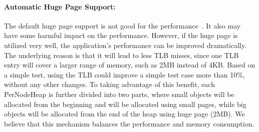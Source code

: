 


\paragraph{Automatic Huge Page Support:} The default huge page support is not good for the performance~\cite{}. It also may have some harmful impact on the performance. However, if the huge page is utilized very well, the application's performance can be improved dramatically. The underlying reason is that it will lead to less TLB misses, since one TLB entry will cover a larger range of memory, such as 2MB instead of 4KB. Based on a simple test, using the TLB could improve a simple test case more than 10\%, without any other changes. To taking advantage of this benefit, each PerNodeHeap is further divided into two parts, where small objects will be allocated from the beginning and will be allocated using small pages, while big objects will be allocated from the end of the heap using huge page (2MB). We believe that this mechanism balances the performance and memory consumption.   

